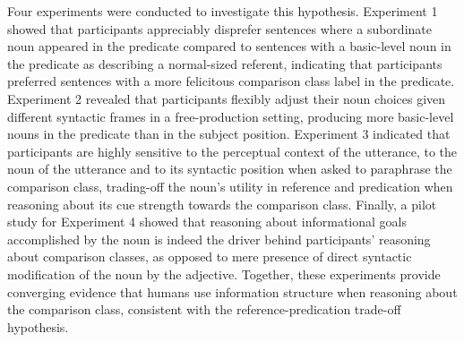 Four experiments were conducted to investigate this hypothesis. Experiment 1 showed that participants appreciably disprefer sentences where a subordinate noun appeared in the predicate compared to sentences with a basic-level noun in the predicate as describing a normal-sized referent, indicating that participants preferred sentences with a more felicitous comparison class label in the predicate. Experiment 2 revealed that participants flexibly adjust their noun choices given different syntactic frames in a free-production setting, producing more basic-level nouns in the predicate than in the subject position. Experiment 3 indicated that participants are highly sensitive to the perceptual context of the utterance, to the noun of the utterance and to its syntactic position when asked to paraphrase the comparison class, trading-off the noun's utility in reference and predication when reasoning about its cue strength towards the comparison class. Finally, a pilot study for Experiment 4 showed that reasoning about informational goals accomplished by the noun is indeed the driver behind participants' reasoning about comparison classes, as opposed to mere presence of direct syntactic modification of the noun by the adjective. %
Together, these experiments provide converging evidence that humans use information structure when reasoning about the comparison class, consistent with the reference-predication trade-off hypothesis. 

